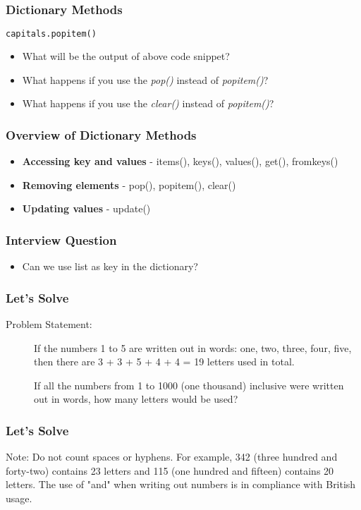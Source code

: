 \documentclass[14pt]{beamer}
\begin{document}
    \begin{frame}[containsverbatim]
	\frametitle{Dictionary Methods}
	\begin{lstlisting}[language=python]
	capitals.popitem()
	\end{lstlisting}
	\begin{itemize}
		\item What will be the output of above code snippet?
		\item What happens if you use the \emph{pop()} instead of \emph{popitem()}?
		\item What happens if you use the \emph{clear()} instead of \emph{popitem()}?

	\end{itemize}
    \end{frame}
    \begin{frame}
	\frametitle{Overview of Dictionary Methods}
	\begin{itemize}
	\item \textbf{Accessing key and values} - items(), keys(), values(), get(), fromkeys()
	\item \textbf{Removing elements} - pop(), popitem(), clear()
	\item \textbf{Updating values} - update()
	\end{itemize}
    \end{frame}
    \begin{frame}
	\frametitle{Interview Question}
	\begin{itemize}
		\item Can we use list as key in the dictionary?
	\end{itemize}
    \end{frame}
    \begin{frame}
	\frametitle{Let's Solve}
	\begin{description}
		\item [Problem Statement:] If the numbers 1 to 5 are written out in words: one, two, three, four, five, then there are 3 + 3 + 5 + 4 + 4 = 19 letters used in total.

		If all the numbers from 1 to 1000 (one thousand) inclusive were written out in words, how many letters would be used?
	\end{description}
    \end{frame}
    \begin{frame}
	\frametitle{Let's Solve}
	\begin{description}
		\item {Note:} Do not count spaces or hyphens. For example, 342 (three hundred and forty-two) contains 23 letters and 115 (one hundred and fifteen) contains 20 letters. The use of "and" when writing out numbers is in compliance with British usage.
	\end{description}
    \end{frame}
\end{document}
